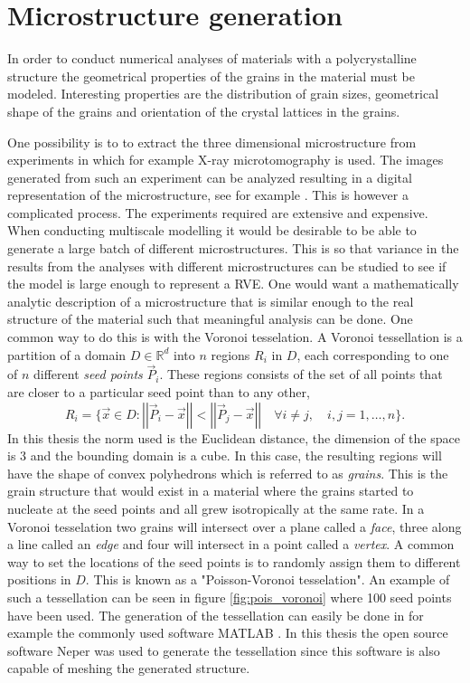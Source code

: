 \documentclass[micro_gen.tex]{subfiles}
\begin{document}
\chapter{Microstructure generation}

In order to conduct numerical analyses of materials with a polycrystalline structure the geometrical properties of the grains in the material must be modeled. Interesting properties are the distribution of grain sizes, geometrical shape of the grains and orientation of the crystal lattices in the grains.

One possibility is to to extract the three dimensional microstructure from experiments in which for example X-ray microtomography is used. The images generated from such an experiment can be analyzed resulting in a digital representation of the microstructure, see for example \cite{Bhandari200722}. This is however a complicated process. The experiments required are extensive and expensive. When conducting multiscale modelling it would be desirable to be able to generate a large batch of different microstructures. This is so that variance in the results from the analyses with different microstructures can be studied to see if the model is large enough to represent a RVE. 
One would want a mathematically analytic description of a microstructure that is similar enough to the real structure of the material such that meaningful analysis can be done. One common way to do this is with the Voronoi tesselation. A Voronoi tessellation is a partition of a domain $D \in \mathbb{R}^d$ into $n$ regions $R_i$ in $D$, each corresponding to one of $n$ different \textit{seed points} $\vec{P}_i$. These regions consists of the set of all points that are closer to a particular seed point than to any other,
%
\[R_i = \{ \vec{x} \in D : \left|\left| \vec{P}_i - \vec{x} \right|\right| < \left|\left| \vec{P}_j - \vec{x} \right|\right| \quad  \forall i \neq j, \quad i,j = 1, \ldots, n \}. \]
%
In this thesis the norm used is the Euclidean distance, the dimension of the space is 3 and the bounding domain is a cube. In this case, the resulting regions will have the shape of convex polyhedrons which is referred to as \textit{grains}. This is the grain structure that would exist in a material where the grains started to nucleate at the seed points and all grew isotropically at the same rate. In a Voronoi tesselation two grains will intersect over a plane called a \textit{face},
three along a line called an \textit{edge} and four will intersect in a point called a \textit{vertex}. A common way to set the locations of the seed points is to randomly assign them to different positions in $D$. 
This is known as a "Poisson-Voronoi tesselation". An example of such a tessellation can be seen in figure \ref{fig:pois_voronoi} where 100 seed points have been used. The generation of the tessellation can easily be done in for example the commonly used software MATLAB \cite{matlab:voronoi}. In this thesis the open source software Neper \cite{Quey20111729} was used to generate the tessellation since this software is also capable of meshing the generated structure. 
\end{document}
